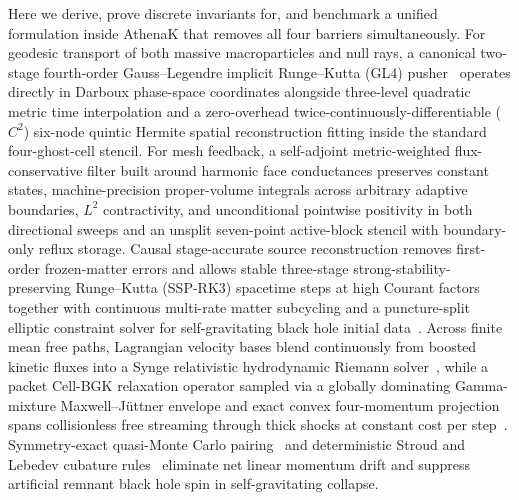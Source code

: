 Here we derive, prove discrete invariants for, and benchmark a unified formulation inside AthenaK that removes all four barriers simultaneously. For geodesic transport of both massive macroparticles and null rays, a canonical two-stage fourth-order Gauss--Legendre implicit Runge--Kutta (GL4) pusher~\cite{SanzSerna:1988} operates directly in Darboux phase-space coordinates alongside three-level quadratic metric time interpolation and a zero-overhead twice-continuously-differentiable ($C^2$) six-node quintic Hermite spatial reconstruction fitting inside the standard four-ghost-cell stencil. For mesh feedback, a self-adjoint metric-weighted flux-conservative filter built around harmonic face conductances preserves constant states, machine-precision proper-volume integrals across arbitrary adaptive boundaries, $L^2$ contractivity, and unconditional pointwise positivity in both directional sweeps and an unsplit seven-point active-block stencil with boundary-only reflux storage. Causal stage-accurate source reconstruction removes first-order frozen-matter errors and allows stable three-stage strong-stability-preserving Runge--Kutta (SSP-RK3) spacetime steps at high Courant factors together with continuous multi-rate matter subcycling and a puncture-split elliptic constraint solver for self-gravitating black hole initial data~\cite{Bowen:1980yu}. Across finite mean free paths, Lagrangian velocity bases blend continuously from boosted kinetic fluxes into a Synge relativistic hydrodynamic Riemann solver~\cite{Synge:1957,Mignone:2005ns}, while a packet Cell-BGK relaxation operator sampled via a globally dominating Gamma-mixture Maxwell--J\"uttner envelope and exact convex four-momentum projection spans collisionless free streaming through thick shocks at constant cost per step~\cite{Israel:1963,Anderson:1974}. Symmetry-exact quasi-Monte Carlo pairing~\cite{Sobol:1967} and deterministic Stroud and Lebedev cubature rules~\cite{Stroud:1971,Lebedev:1976} eliminate net linear momentum drift and suppress artificial remnant black hole spin in self-gravitating collapse.

